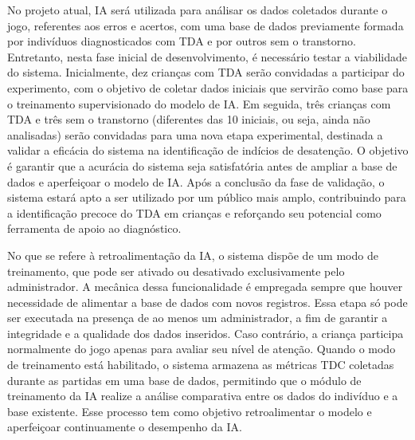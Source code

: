 No projeto atual, IA será utilizada para análisar os dados coletados durante o jogo, referentes aos erros e acertos, com uma base de dados previamente formada por indivíduos diagnosticados com TDA e por outros sem o transtorno. Entretanto, nesta fase inicial de desenvolvimento, é necessário testar a viabilidade do sistema. Inicialmente, dez crianças com TDA serão convidadas a participar do experimento, com o objetivo de coletar dados iniciais que servirão como base para o treinamento supervisionado do modelo de IA. Em seguida, três crianças com TDA e três sem o transtorno (diferentes das 10 iniciais, ou seja, ainda não analisadas) 
serão convidadas para uma nova etapa experimental, destinada a validar a eficácia do sistema na identificação de indícios de desatenção. O objetivo é garantir que a acurácia do sistema seja satisfatória antes de ampliar a base de dados e aperfeiçoar o modelo de IA. Após a conclusão da fase de validação, o sistema estará apto a ser utilizado por um público mais amplo, contribuindo para a identificação precoce do TDA em crianças e reforçando seu potencial como ferramenta de apoio ao diagnóstico. 

No que se refere à retroalimentação da IA, o sistema dispõe de um modo de treinamento, que pode ser ativado ou desativado exclusivamente pelo administrador. A mecânica dessa funcionalidade é empregada sempre que houver necessidade de alimentar a base de dados com novos registros. Essa etapa só pode ser executada na presença de ao menos um administrador, a fim de garantir a integridade e a qualidade dos dados inseridos. Caso contrário, a criança participa normalmente do jogo apenas para avaliar seu nível de atenção. Quando o modo de treinamento está habilitado, o sistema armazena as métricas TDC coletadas durante as partidas em uma base de dados, permitindo que o módulo de treinamento da IA realize a análise comparativa entre os dados do indivíduo e a base existente. Esse processo tem como objetivo retroalimentar o modelo e aperfeiçoar continuamente o desempenho da IA. 

